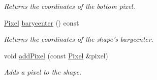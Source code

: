 \begin{CompactItemize}
\begin{CompactList}\small\item\em Returns the coordinates of the bottom pixel. \item\end{CompactList}\item 
\hyperlink{_shape_8hpp_535e59456e3e633842529cfa8ea103c4}{Pixel} \hyperlink{class_shape_a935b8870ea61569990b304b77513923}{barycenter} () const 
\begin{CompactList}\small\item\em Returns the coordinates of the shape's barycenter. \item\end{CompactList}\item 
void \hyperlink{class_shape_f6114234203d9473f1fef9e6391f9243}{addPixel} (const \hyperlink{_shape_8hpp_535e59456e3e633842529cfa8ea103c4}{Pixel} \&pixel)
\begin{CompactList}\small\item\em Adds a pixel to the shape. \item\end{CompactList}\end{CompactItemize}
